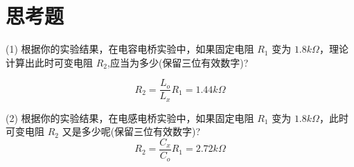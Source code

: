 \documentclass[12pt]{article}
\begin{document}
\section{思考题}

(1) 根据你的实验结果，在电容电桥实验中，如果固定电阻 $R_1$ 变为 $1.8k\Omega$，理论计算出此时可变电阻 $R_2$,应当为多少(保留三位有效数字)?

\begin{equation}
    R_2=\frac{L_o}{L_x}R_1=1.44k\Omega
\end{equation}

(2) 根据你的实验结果，在电感电桥实验中，如果固定电阻 $R_1$ 变为 $1.8k\Omega$，此时可变电阻 $R_2$ 又是多少呢(保留三位有效数字)?
\begin{equation}
    R_2=\frac{C_x}{C_o}R_1=2.72k\Omega
\end{equation}
\end{document}
